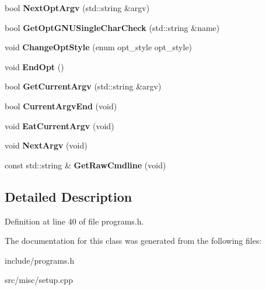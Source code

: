 \begin{DoxyCompactItemize}
\item 
\hypertarget{classCommandLine_a090151cab04fbb6e886f2053e2ef56a3}{bool {\bfseries Next\-Opt\-Argv} (std\-::string \&argv)}\label{classCommandLine_a090151cab04fbb6e886f2053e2ef56a3}

\item 
\hypertarget{classCommandLine_ac94cc029aca101fb5e39189fca40ff91}{bool {\bfseries Get\-Opt\-G\-N\-U\-Single\-Char\-Check} (std\-::string \&name)}\label{classCommandLine_ac94cc029aca101fb5e39189fca40ff91}

\item 
\hypertarget{classCommandLine_ac0f91f63b77400b7266128dbc1445b1b}{void {\bfseries Change\-Opt\-Style} (enum opt\-\_\-style opt\-\_\-style)}\label{classCommandLine_ac0f91f63b77400b7266128dbc1445b1b}

\item 
\hypertarget{classCommandLine_a941c71120faefc5e3c0876d69ac78491}{void {\bfseries End\-Opt} ()}\label{classCommandLine_a941c71120faefc5e3c0876d69ac78491}

\item 
\hypertarget{classCommandLine_a331a3c1e87e6a2c0306cf1e9f7a67945}{bool {\bfseries Get\-Current\-Argv} (std\-::string \&argv)}\label{classCommandLine_a331a3c1e87e6a2c0306cf1e9f7a67945}

\item 
\hypertarget{classCommandLine_ad457fad3218a71163a058bc095cfe0ed}{bool {\bfseries Current\-Argv\-End} (void)}\label{classCommandLine_ad457fad3218a71163a058bc095cfe0ed}

\item 
\hypertarget{classCommandLine_ab34d4cf4cb665ecb694f90e5f9c524c3}{void {\bfseries Eat\-Current\-Argv} (void)}\label{classCommandLine_ab34d4cf4cb665ecb694f90e5f9c524c3}

\item 
\hypertarget{classCommandLine_a89dd608d9095a3321d48eb90ecf210ba}{void {\bfseries Next\-Argv} (void)}\label{classCommandLine_a89dd608d9095a3321d48eb90ecf210ba}

\item 
\hypertarget{classCommandLine_aee2a64d26ecb790666b084d79dd565b0}{const std\-::string \& {\bfseries Get\-Raw\-Cmdline} (void)}\label{classCommandLine_aee2a64d26ecb790666b084d79dd565b0}

\end{DoxyCompactItemize}


\subsection{Detailed Description}


Definition at line 40 of file programs.\-h.



The documentation for this class was generated from the following files\-:\begin{DoxyCompactItemize}
\item 
include/programs.\-h\item 
src/misc/setup.\-cpp\end{DoxyCompactItemize}
